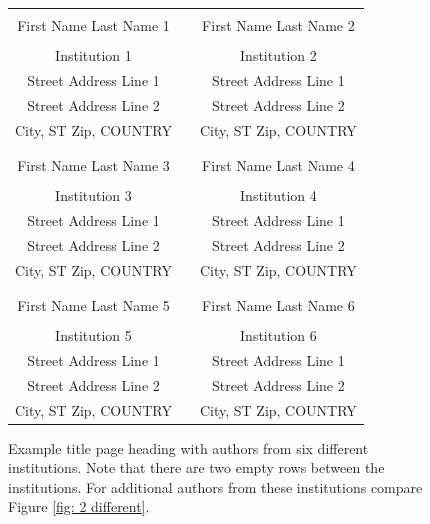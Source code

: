 \documentclass{wscpaperproc}
\theoremstyle{wsc}
\begin{document}
\begin{figure}[htb]
{
\centering
\begin{tabular}{ccc}
\phantom{Adjust spacing using these entries} & \phantom{intermediate space} & \phantom{Adjust spacing using these entries} \\
First Name Last Name 1 & & First Name Last Name 2 \\
\\
Institution 1 & & Institution 2 \\
Street Address Line 1 & & Street Address Line 1 \\
Street Address Line 2 & & Street Address Line 2 \\
City, ST Zip, COUNTRY & & City, ST Zip, COUNTRY \\
\\ \\
First Name Last Name 3 & & First Name Last Name 4 \\
\\
Institution 3 & & Institution 4 \\
Street Address Line 1 & & Street Address Line 1 \\
Street Address Line 2 & & Street Address Line 2 \\
City, ST Zip, COUNTRY & & City, ST Zip, COUNTRY \\
\\ \\
First Name Last Name 5 & & First Name Last Name 6 \\
\\
Institution 5 & & Institution 6 \\
Street Address Line 1 & & Street Address Line 1 \\
Street Address Line 2 & & Street Address Line 2 \\
City, ST Zip, COUNTRY & & City, ST Zip, COUNTRY
\end{tabular}
\caption{Example title page heading with authors from six different institutions. Note that there are two empty rows between the institutions. For additional authors from these institutions compare Figure \ref{fig: 2 different}. \label{fig: 6 different}}
}
\end{figure}

\clearpage
\end{document}
